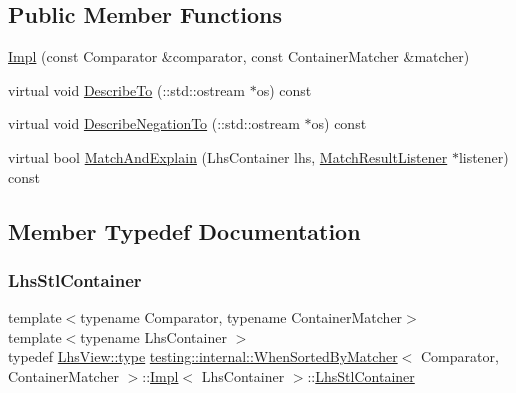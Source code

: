 \subsection*{Public Member Functions}
\begin{DoxyCompactItemize}
\item 
\hyperlink{classtesting_1_1internal_1_1_when_sorted_by_matcher_1_1_impl_a63235e98dec5478b7ff9d06f6babc716}{Impl} (const Comparator \&comparator, const Container\+Matcher \&matcher)
\item 
virtual void \hyperlink{classtesting_1_1internal_1_1_when_sorted_by_matcher_1_1_impl_a33f7b8bdce4adb02618e90ac2ec949f9}{Describe\+To} (\+::std\+::ostream $\ast$os) const
\item 
virtual void \hyperlink{classtesting_1_1internal_1_1_when_sorted_by_matcher_1_1_impl_a0a59f77fdbb88a6326e5aba671f2aa3e}{Describe\+Negation\+To} (\+::std\+::ostream $\ast$os) const
\item 
virtual bool \hyperlink{classtesting_1_1internal_1_1_when_sorted_by_matcher_1_1_impl_a9d8f57c729df8c041f2fd7febbc950da}{Match\+And\+Explain} (Lhs\+Container lhs, \hyperlink{classtesting_1_1_match_result_listener}{Match\+Result\+Listener} $\ast$listener) const
\end{DoxyCompactItemize}


\subsection{Member Typedef Documentation}
\mbox{\label{classtesting_1_1internal_1_1_when_sorted_by_matcher_1_1_impl_a2cb1a8d85ca2c376b6abdbcb00d84759}} 
\subsubsection{\texorpdfstring{Lhs\+Stl\+Container}{LhsStlContainer}}
{\footnotesize\ttfamily template$<$typename Comparator, typename Container\+Matcher$>$ \\
template$<$typename Lhs\+Container $>$ \\
typedef \hyperlink{classtesting_1_1internal_1_1_stl_container_view_a2b2c63a6dcdbfe63fb0ee121ebf463ba}{Lhs\+View\+::type} \hyperlink{classtesting_1_1internal_1_1_when_sorted_by_matcher}{testing\+::internal\+::\+When\+Sorted\+By\+Matcher}$<$ Comparator, Container\+Matcher $>$\+::\hyperlink{classtesting_1_1internal_1_1_when_sorted_by_matcher_1_1_impl}{Impl}$<$ Lhs\+Container $>$\+::\hyperlink{classtesting_1_1internal_1_1_when_sorted_by_matcher_1_1_impl_a2cb1a8d85ca2c376b6abdbcb00d84759}{Lhs\+Stl\+Container}}

